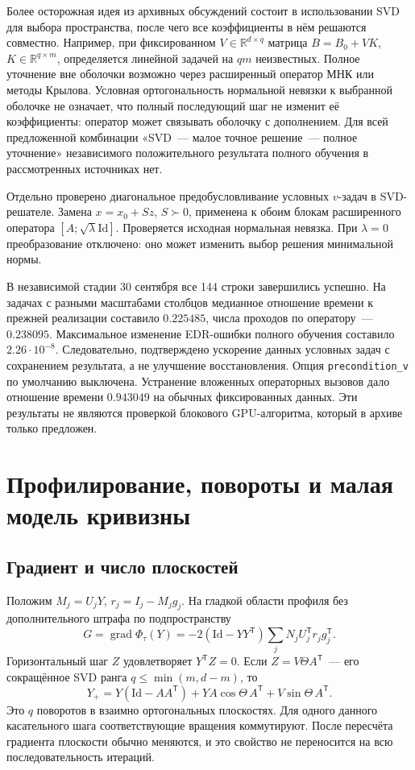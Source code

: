 \documentclass[11pt,a4paper]{article}
\numberwithin{equation}{section}
\newcommand{\R}{\mathbb R}
\newcommand{\Id}{\mathrm{Id}}
\newcommand{\T}{^{\mathsf T}}
\newcommand{\file}[1]{\nolinkurl{#1}}
\DeclareMathOperator{\grad}{grad}
\begin{document}
Более осторожная идея из архивных обсуждений состоит в использовании
SVD для выбора пространства, после чего все коэффициенты в нём
решаются совместно. Например, при фиксированном $V\in\R^{d\times q}$
матрица $B=B_0+VK$, $K\in\R^{q\times m}$, определяется линейной
задачей на $qm$ неизвестных. Полное уточнение вне оболочки возможно
через расширенный оператор МНК или методы Крылова.
Условная ортогональность нормальной невязки к выбранной оболочке
не означает, что полный последующий шаг не изменит её коэффициенты:
оператор может связывать оболочку с дополнением.
Для всей предложенной комбинации «SVD~--- малое точное решение~---
полное уточнение» независимого положительного результата полного
обучения в рассмотренных источниках нет.\cite{svd,archivecoarse}

Отдельно проверено диагональное предобусловливание условных
$v$-задач в SVD-решателе. Замена $x=x_0+Sz$, $S\succ0$,
применена к обоим блокам расширенного оператора
$[A;\sqrt\lambda\Id]$. Проверяется исходная нормальная невязка.
При $\lambda=0$ преобразование отключено: оно может изменить
выбор решения минимальной нормы.

В независимой стадии 30 сентября все 144 строки завершились успешно.
На задачах с разными масштабами столбцов медианное отношение времени
к прежней реализации составило $0.225485$, числа проходов по оператору~---
$0.238095$. Максимальное изменение EDR-ошибки полного обучения
составило $2.26\cdot10^{-8}$. Следовательно, подтверждено ускорение
данных условных задач с сохранением результата, а не улучшение
восстановления. Опция \file{precondition_v} по умолчанию выключена.
Устранение вложенных операторных вызовов дало отношение времени
$0.943049$ на обычных фиксированных данных.
Эти результаты не являются проверкой блокового GPU-алгоритма,
который в архиве только предложен.\cite{svdprecond}

\section{Профилирование, повороты и малая модель кривизны}
\label{sec:geometry}

\subsection{Градиент и число плоскостей}

Положим $M_j=U_jY$, $r_j=I_j-M_jg_j$. На гладкой области
профиля без дополнительного штрафа по подпространству
\begin{equation}\label{eq:gradient}
 G=\grad\Phi_\tau(Y)=
 -2(\Id-YY\T)\sum_jN_jU_j\T r_jg_j\T.
\end{equation}
Горизонтальный шаг $Z$ удовлетворяет $Y\T Z=0$. Если
$Z=V\Theta A\T$~--- его сокращённое SVD ранга
$q\le\min(m,d-m)$, то
\begin{equation}\label{eq:exp}
 Y_+=Y(\Id-AA\T)+YA\cos\Theta\,A\T
                         +V\sin\Theta\,A\T.
\end{equation}
Это $q$ поворотов в взаимно ортогональных плоскостях.
Для одного данного касательного шага соответствующие вращения коммутируют.
После пересчёта градиента плоскости обычно меняются, и это свойство
не переносится на всю последовательность итераций.
\end{document}
